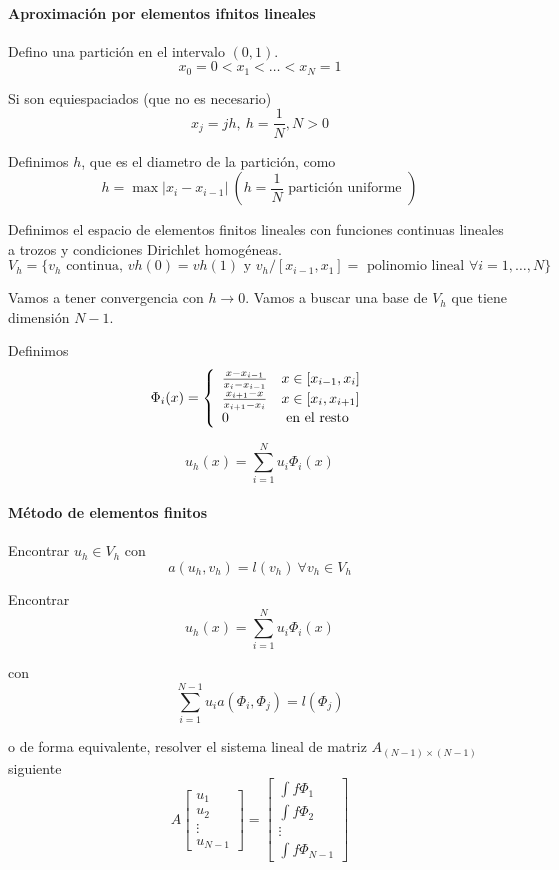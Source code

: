 	\paragraph{Aproximación por elementos ifnitos lineales}
	
	Defino una partición en el intervalo $(0,1)$.
	$$x_0 = 0< x_1 <\hdots < x_N = 1$$
	
	Si son equiespaciados (que no es necesario)
	$$x_j = jh,\ h=\frac{1}{N}, N>0$$
	
	Definimos $h$, que es el diametro de la partición, como
	$$h=\max |x_i-x_{i-1}|\ (h=\frac{1}{N}\text{ partición uniforme })$$
	
	Definimos el espacio de elementos finitos lineales con funciones continuas lineales a trozos y condiciones Dirichlet homogéneas.
	$$V_h  = \{v_h\text{ continua, } vh(0)=vh(1)\text{ y } v_h/\left[x_{i-1}, x_1\right] = \text{ polinomio lineal } \forall i=1,\hdots, N\}$$
	
	Vamos a tener convergencia con $h\to 0$.
	Vamos a buscar una base de $V_h$ que tiene dimensión $N-1$.
	
	Definimos
	\begin{equation*}
		\Phi_i(x) = \left\{
		\begin{array}{l l l}
			\frac{x-x_{i-1}}{x_i-x_{i-1}}& x\in\left[x_{i-1}, x_i\right]\\
			\frac{x_{i+1}-x}{x_{i+1}-x_{i}}& x\in\left[x_{i}, x_{i+1}\right]\\
			0 & \text{ en el resto}\\
		\end{array}
		\right.
	\end{equation*}
	
	$$u_h(x) = \sum_{i=1}^N u_i\Phi_i(x)$$
	
	\paragraph{Método de elementos finitos}
	Encontrar $u_h\in V_h$ con 
	$$a(u_h, v_h) = l(v_h)\ \forall v_h\in V_h$$
	
	Encontrar
	$$u_h(x) = \sum_{i=1}^{N} u_i\Phi _i(x)$$
	
	con 
	$$\sum_{i=1}^{N-1} u_i a(\Phi_i, \Phi_j) = l(\Phi_j)$$
	
	o de forma equivalente, resolver el sistema lineal de matriz $A_{(N-1)\times(N-1)}$ siguiente
	\begin{equation*}
		A
		\begin{bmatrix}
			u_1\\u_2\\\vdots\\u_{N-1}
		\end{bmatrix}
		=
		\begin{bmatrix}
			\int f\Phi_1\\
			\int f\Phi_2\\
			\vdots\\
			\int f\Phi_{N-1}
		\end{bmatrix}
	\end{equation*}
	
